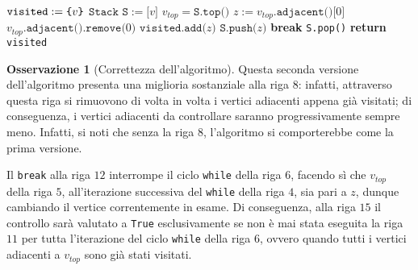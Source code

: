 \documentclass[14pt]{extreport}
\theoremstyle{definition}
\theoremstyle{definition}
\newtheorem{remark}{Osservazione}[subsection]
\begin{document}
\begin{algorithm}[H]
    \caption{
        Seconda versione dell'algoritmo; dato un grafo indiretto $G$, rappresentato attraverso liste di adiacenza, e un suo vertice $v$, l'algoritmo restituisce tutti i vertici, raggiungibili attraverso cammini, partendo da $v$.\\
        \textbf{Input}: $G$ grafo indiretto, rappresentato attraverso liste di adiacenza; $v$ un vertice di $G$.\\
        \textbf{Output}: i vertici raggiungibili da $v$.
    }

    \begin{algorithmic}[1]
        \label{findReachableNodes2}
            \State $\texttt{visited} := \verb|{|v\verb|}|$
            \State $\texttt{Stack S} := \texttt{[}v\texttt{]}$
                \State $v_{top}=\texttt{S.top()}$
                    \State $z := v_{top}\texttt{.adjacent()[}0\texttt{]}$
                    \State $v_{top}\texttt{.adjacent().remove(}0\texttt{)}$ 
                        \State $\texttt{visited.add(}z\texttt{)}$
                        \State $\texttt{S.push(}z\texttt{)}$
                        \State \textbf{break}
                    \EndIf
                \EndWhile
                    \State \texttt{S.pop()}
                \EndIf
            \EndWhile
            \State \textbf{return} \texttt{visited}
        \EndFunction
    \end{algorithmic}
\end{algorithm}

\begin{remark}[Correttezza dell'algoritmo]
    Questa seconda versione dell'algoritmo presenta una miglioria sostanziale alla riga $8$: infatti, attraverso questa riga si rimuovono di volta in volta i vertici adiacenti appena già visitati; di conseguenza, i vertici adiacenti da controllare saranno progressivamente sempre meno. Infatti, si noti che senza la riga $8$, l'algoritmo si comporterebbe come la prima versione.

    Il \texttt{break} alla riga $12$ interrompe il ciclo \texttt{while} della riga $6$, facendo sì che $v_{top}$ della riga $5$, all'iterazione successiva del \texttt{while} della riga $4$, sia pari a $z$, dunque cambiando il vertice correntemente in esame. Di conseguenza, alla riga $15$ il controllo sarà valutato a \texttt{True} esclusivamente se non è mai stata eseguita la riga $11$ per tutta l'iterazione del ciclo \texttt{while} della riga $6$, ovvero quando tutti i vertici adiacenti a $v_{top}$ sono già stati visitati.
\end{remark}
\end{document}
